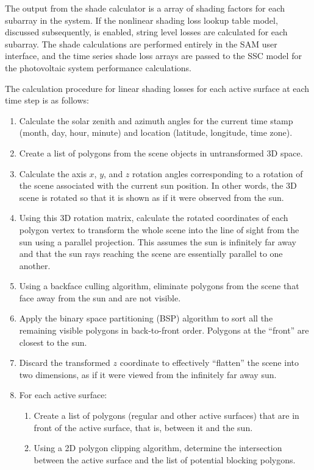 \documentclass[12pt,letterpaper]{article}
\begin{document}
The output from the shade calculator is a array of shading factors for each subarray in the system.  If the nonlinear shading loss lookup table model, discussed subsequently, is enabled, string level losses are calculated for each subarray.  The shade calculations are performed entirely in the SAM user interface, and the time series shade loss arrays are passed to the SSC model for the photovoltaic system performance calculations.

The calculation procedure for linear shading losses for each active surface at each time step is as follows:

\begin{enumerate}
\item Calculate the solar zenith and azimuth angles for the current time stamp (month, day, hour, minute) and location (latitude, longitude, time zone).
\item Create a list of polygons from the scene objects in untransformed 3D space.
\item Calculate the axis $x$, $y$, and $z$ rotation angles corresponding to a rotation of the scene associated with the current sun position.  In other words, the 3D scene is rotated so that it is shown as if it were observed from the sun.
\item Using this 3D rotation matrix, calculate the rotated coordinates of each polygon vertex to transform the whole scene into the line of sight from the sun using a parallel projection.  This assumes the sun is infinitely far away and that the sun rays reaching the scene are essentially parallel to one another.
\item Using a backface culling algorithm, eliminate polygons from the scene that face away from the sun and are not visible.
\item Apply the binary space partitioning (BSP) algorithm to sort all the remaining visible polygons in back-to-front order.  Polygons at the ``front'' are closest to the sun.
\item Discard the transformed $z$ coordinate to effectively ``flatten'' the scene into two dimensions, as if it were viewed from the infinitely far away sun.
	\item For each active surface:
	\begin{enumerate}
	\item Create a list of polygons (regular and other active surfaces) that are in front of the active surface, that is, between it and the sun.
	\item Using a 2D polygon clipping algorithm, determine the intersection between the active surface and the list of potential blocking polygons.

\end{enumerate}
\end{enumerate}
\end{document}
